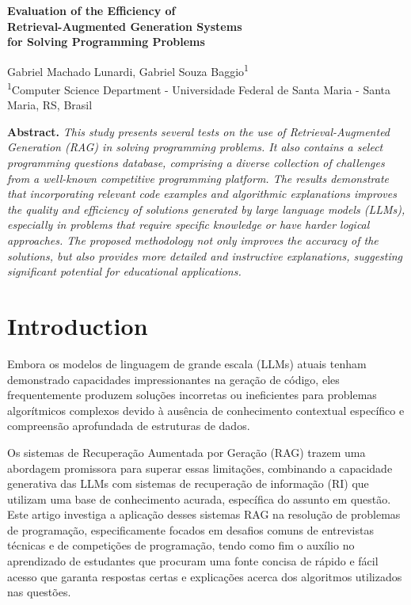 \documentclass[a4paper,12pt]{article}
\begin{document}
\vspace{2cm}

\begin{center}
    {\Large\bfseries Evaluation of the Efficiency of \\
    Retrieval-Augmented Generation Systems\\
    for Solving Programming Problems \\[1em]}
    
    \normalsize
    Gabriel Machado Lunardi, Gabriel Souza Baggio\textsuperscript{1}\\[0.5em]
    
    \small
    \textsuperscript{1}Computer Science Department - Universidade Federal de Santa Maria - Santa Maria, RS, Brasil
\end{center}

\vspace{1cm}

\noindent
\textbf{Abstract.} \textit{
This study presents several tests on the use of Retrieval-Augmented Generation (RAG) in solving programming problems. It also contains a select programming questions database, comprising a diverse collection of challenges from a well-known competitive programming platform. The results demonstrate that incorporating relevant code examples and algorithmic explanations improves the quality and efficiency of solutions generated by large language models (LLMs), especially in problems that require specific knowledge or have harder logical approaches. The proposed methodology not only improves the accuracy of the solutions, but also provides more detailed and instructive explanations, suggesting significant potential for educational applications.
}

\vspace{1cm}

\section{Introduction}
Embora os modelos de linguagem de grande escala (LLMs) atuais tenham demonstrado capacidades impressionantes na geração de código, eles frequentemente produzem soluções incorretas ou ineficientes para problemas algorítmicos complexos devido à ausência de conhecimento contextual específico e compreensão aprofundada de estruturas de dados.

Os sistemas de Recuperação Aumentada por Geração (RAG) trazem uma abordagem promissora para superar essas limitações, combinando a capacidade generativa das LLMs com sistemas de recuperação de informação (RI) que utilizam uma base de conhecimento acurada, específica do assunto em questão. Este artigo investiga a aplicação desses sistemas RAG na resolução de problemas de programação, especificamente focados em desafios comuns de entrevistas técnicas e de competições de programação, tendo como fim o auxílio no aprendizado de estudantes que procuram uma fonte concisa de rápido e fácil acesso que garanta respostas certas e explicações acerca dos algoritmos utilizados nas questões.
\end{document}
